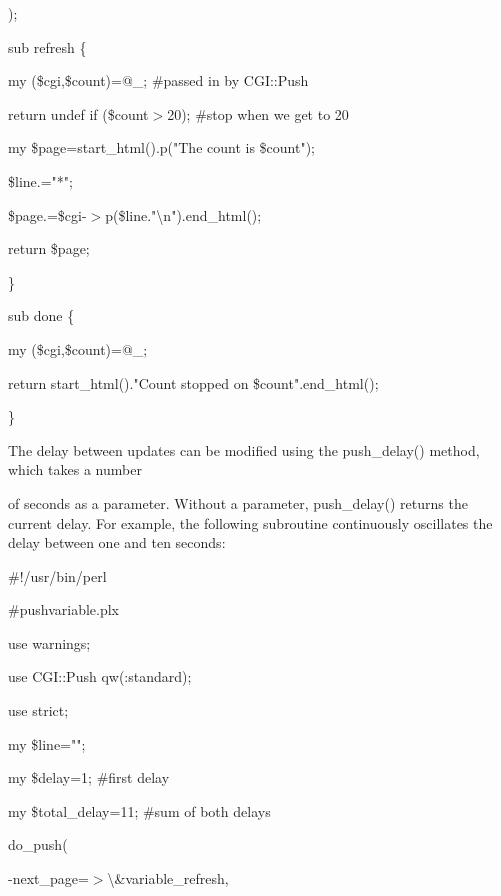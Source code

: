 \documentclass[a4paper,11pt]{book}
\begin{document}
\noindent );

\noindent 

\noindent sub refresh \{

\noindent my (\$cgi,\$count)=@\_; \#passed in by CGI::Push

\noindent 

\noindent return undef if (\$count$>$20); \#stop when we get to 20

\noindent 

\noindent my \$page=start\_html().p("The count is \$count");

\noindent \$line.="*";

\noindent \$page.=\$cgi-$>$p(\$line."\textbackslash n").end\_html();

\noindent return \$page;

\noindent \}

\noindent 

\noindent sub done \{

\noindent my (\$cgi,\$count)=@\_;

\noindent 

\noindent return start\_html()."Count stopped on \$count".end\_html();

\noindent \}

\noindent 

\noindent The delay between updates can be modified using the push\_delay() method, which takes a number

\noindent of seconds as a parameter. Without a parameter, push\_delay() returns the current delay. For example, the following subroutine continuously oscillates the delay between one and ten seconds:

\noindent 

\noindent \#!/usr/bin/perl

\noindent \#pushvariable.plx

\noindent use warnings;

\noindent use CGI::Push qw(:standard);

\noindent use strict;

\noindent 

\noindent my \$line="";

\noindent my \$delay=1; \#first delay

\noindent my \$total\_delay=11; \#sum of both delays

\noindent 

\noindent do\_push(

\noindent -next\_page=$>$\textbackslash \&variable\_refresh,
\end{document}
